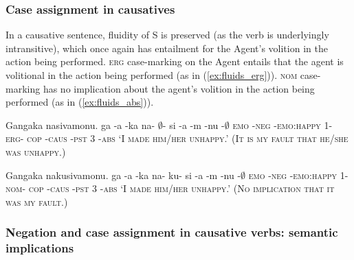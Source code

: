\documentclass[12pt]{article}
\newcommand{\N}{\textipa{N}} %
\newcommand{\OO}{\textipa{O}} %
\newcommand{\B}{\textipa{B}} %
\newcommand{\0}{$\emptyset$} %
\newcommand{\D}{\scshape} %
\newcommand{\nom}{\D{nom}}
\newcommand{\erg}{\D{erg}}
\newcommand{\abs}{\D{abs}}
\newcommand{\emo}{\D{emo}}
\newcommand{\cop}{\D{cop}}
\newcommand{\caus}{\D{caus}}
\newcommand{\pst}{\D{pst}}
\begin{document}
			\subsubsection{Case assignment in causatives}
				In a causative sentence, fluidity of S is preserved (as the verb is underlyingly intransitive), which once again has entailment for the Agent's volition in the action being performed. {\D{erg}} case-marking on the Agent entails that the agent is volitional in the action being performed (as in (\ref{ex:fluids_erg})). {\D{nom}} case-marking has no implication about the agent's volition in the action being performed (as in (\ref{ex:fluids_abs})). 

				\begin{example}											   
				\label{ex:fluids_erg}										   
						Gangaka nasivamonu. 
						\gll ga -\N a -ka na- \0- si -\B a {-m\OO} -nu -\0						   
			   			{\emo} -{\D{neg}} -{\D{emo:happy}} 1- {\erg-} {\cop} {-\caus} {-\pst} 3 -\abs
						\glt `I made him/her unhappy.' (It is my fault that he/she was unhappy.) 								   
						\glend 												   
				\end{example}

				\begin{example}
				\label{ex:fluids_abs}
						Gangaka nakusivamonu. 
						\gll ga -\N a -ka na- ku- si -\B a {-m\OO} -nu -\0				   
			   			{\emo} -{\D{neg}} -{\D{emo:happy}} 1- {\nom}- {\cop} {-\caus} {-\pst} 3 -\abs
						\glt `I made him/her unhappy.' (No implication that it was my fault.)
						\glend
				\end{example}

			\subsubsection{Negation and case assignment in causative verbs: semantic implications}
\end{document}

